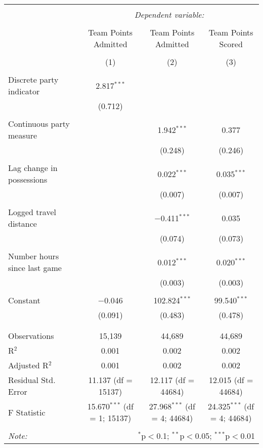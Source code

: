 \documentclass[letterpaper,12pt]{article}
\begin{document}
\hspace{-125pt}
\begin{tabular}{@{\extracolsep{5pt}}lccc}  \\[-1.8ex]\hline  \hline \\[-1.8ex]   & \multicolumn{3}{c}{\textit{Dependent variable:}} \\  \cline{2-4}  \\[-1.8ex] & Team Points Admitted & Team Points Admitted & Team Points Scored \\  \\[-1.8ex] & (1) & (2) & (3)\\  \hline \\[-1.8ex]   Discrete party indicator & 2.817$^{***}$ &  &  \\    & (0.712) &  &  \\    & & & \\   Continuous party measure &  & 1.942$^{***}$ & 0.377 \\    &  & (0.248) & (0.246) \\    & & & \\   Lag change in possessions &  & 0.022$^{***}$ & 0.035$^{***}$ \\    &  & (0.007) & (0.007) \\    & & & \\   Logged travel distance &  & $-$0.411$^{***}$ & 0.035 \\    &  & (0.074) & (0.073) \\    & & & \\   Number hours since last game &  & 0.012$^{***}$ & 0.020$^{***}$ \\    &  & (0.003) & (0.003) \\    & & & \\   Constant & $-$0.046 & 102.824$^{***}$ & 99.540$^{***}$ \\    & (0.091) & (0.483) & (0.478) \\    & & & \\  \hline \\[-1.8ex]  Observations & 15,139 & 44,689 & 44,689 \\  R$^{2}$ & 0.001 & 0.002 & 0.002 \\  Adjusted R$^{2}$ & 0.001 & 0.002 & 0.002 \\  Residual Std. Error & 11.137 (df = 15137) & 12.117 (df = 44684) & 12.015 (df = 44684) \\  F Statistic & 15.670$^{***}$ (df = 1; 15137) & 27.968$^{***}$ (df = 4; 44684) & 24.325$^{***}$ (df = 4; 44684) \\  \hline  \hline \\[-1.8ex]  \textit{Note:}  & \multicolumn{3}{r}{$^{*}$p$<$0.1; $^{**}$p$<$0.05; $^{***}$p$<$0.01} \\  \end{tabular}  
  
\end{document}
